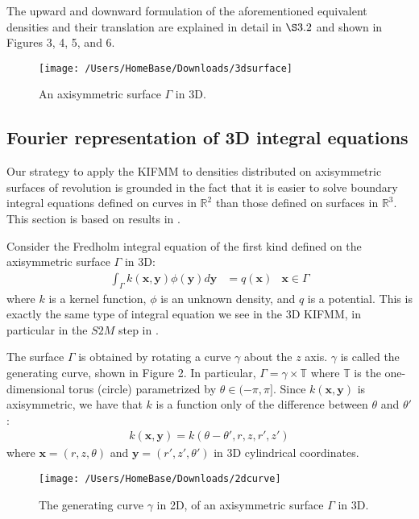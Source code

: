 \documentclass[12pt,letterpaper]{article}
\begin{document}
The upward and downward formulation of the aforementioned equivalent densities and their translation are explained in detail in $\S3.2$ and shown in Figures 3, 4, 5, and 6.

\begin{figure}[!ht]
\begin{center}
\texttt{[image: /Users/HomeBase/Downloads/3dsurface]}
\end{center}
\caption{An axisymmetric surface $\Gamma$ in 3D.}
\end{figure}

\subsection{Fourier representation of 3D integral equations}
Our strategy to apply the KIFMM to densities distributed on axisymmetric surfaces of revolution is grounded in the fact that it is easier to solve boundary integral equations defined on curves in $\mathbb{R}^2$ than those defined on surfaces in $\mathbb{R}^3$. This section is based on results in \cite{YYM}.

Consider the Fredholm integral equation of the first kind defined on the axisymmetric surface $\Gamma$ in 3D:
\begin{align}
\int_\Gamma k(\mathbf{x},\mathbf{y})\phi(\mathbf{y})d\mathbf{y} &= q(\mathbf{x}) &\mathbf{x}\in\Gamma
\end{align}
where $k$ is a kernel function, $\phi$ is an unknown density, and $q$ is a potential. This is exactly the same type of integral equation we see in the 3D KIFMM, in particular in the $S2M$ step in \cite{YBZ}.

The surface $\Gamma$ is obtained by rotating a curve $\gamma$ about the $z$ axis. $\gamma$ is called the generating curve, shown in Figure 2. In particular, $\Gamma=\gamma\times\mathbb{T}$ where $\mathbb{T}$ is the one-dimensional torus (circle) parametrized by $\theta\in(-\pi,\pi]$. Since $k(\mathbf{x},\mathbf{y})$ is axisymmetric, we have that $k$ is a function only of the difference between $\theta$ and $\theta'$:
\begin{align}
k(\mathbf{x},\mathbf{y})=k(\theta-\theta',r,z,r',z')
\end{align}
where $\mathbf{x}=(r,z,\theta)$ and $\mathbf{y}=(r',z',\theta')$  in 3D cylindrical coordinates.

\begin{figure}[!ht]
\begin{center}
\texttt{[image: /Users/HomeBase/Downloads/2dcurve]}
\end{center}
\caption{The generating curve $\gamma$ in 2D, of an axisymmetric surface $\Gamma$ in 3D.}
\end{figure}
\end{document}
